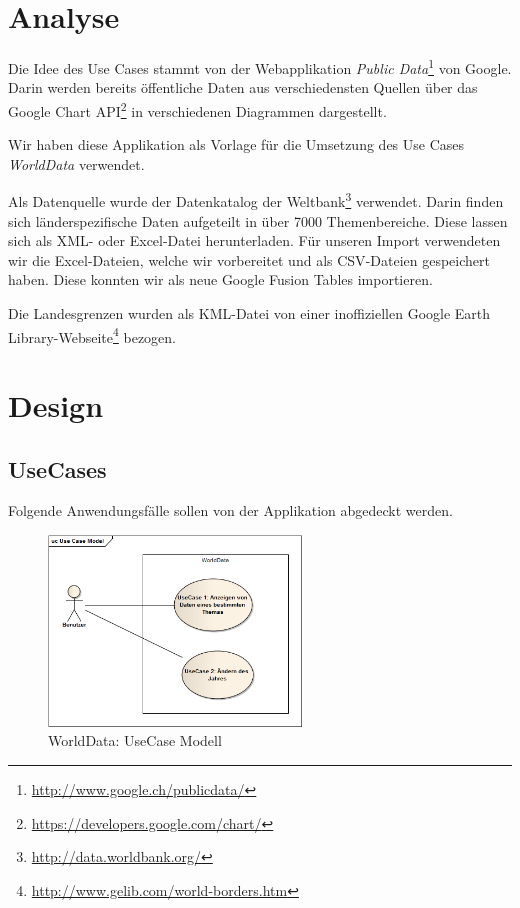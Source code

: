 \section{Analyse}
Die Idee des Use Cases stammt von der Webapplikation \emph{Public Data}\footnote{\url{http://www.google.ch/publicdata/}} von Google. Darin werden bereits öffentliche Daten aus verschiedensten Quellen über das Google Chart API\footnote{\url{https://developers.google.com/chart/}} in verschiedenen Diagrammen dargestellt.

Wir haben diese Applikation als Vorlage für die Umsetzung des Use Cases \emph{WorldData} verwendet. 

Als Datenquelle wurde der Datenkatalog der Weltbank\footnote{\url{http://data.worldbank.org/}} verwendet. Darin finden sich länderspezifische Daten aufgeteilt in über 7000 Themenbereiche. Diese lassen sich als \gls{XML}- oder Excel-Datei herunterladen. Für unseren Import verwendeten wir die Excel-Dateien, welche wir vorbereitet und als \gls{CSV}-Dateien gespeichert haben. Diese konnten wir als neue Google Fusion Tables importieren.

Die Landesgrenzen wurden als \gls{KML}-Datei von einer inoffiziellen Google Earth Library-Webseite\footnote{\url{http://www.gelib.com/world-borders.htm}} bezogen. 

\section{Design}

\subsection{UseCases}
Folgende Anwendungsfälle sollen von der Applikation abgedeckt werden.

\begin{figure}[H]
	\centering
	\includegraphics[width=0.6\textwidth]{images/usecase1-worlddata/uml/worlddata-usecasemodel}
	\caption{WorldData: UseCase Modell}
	\label{worlddata-usecasemodel}
\end{figure}

